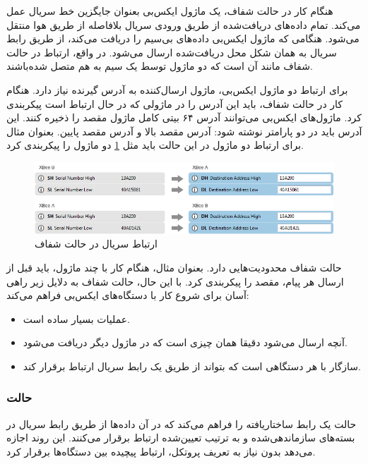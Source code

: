 هنگام کار در حالت شفاف، یک ماژول ایکس‌بی بعنوان جایگزین خط سریال عمل می‌کند. تمام داده‌های دریافت‌شده از طریق ورودی سریال بلافاصله از طریق هوا منتقل می‌شود. هنگامی که ماژول ایکس‌بی داده‌های بی‌سیم را دریافت می‌کند، از طریق رابط سریال به همان شکل محل دریافت‌شده ارسال می‌شود. در واقع، ارتباط در حالت شفاف مانند آن است که دو ماژول توسط یک سیم به هم متصل شده‌باشند\cite{Digi}.


برای ارتباط دو ماژول ایکس‌بی، ماژول ارسال‌کننده به آدرس گیرنده نیاز دارد. هنگام کار در حالت شفاف، باید این آدرس را در ماژولی که در حال ارتباط است پیکربندی کرد. ماژول‌های ایکس‌بی می‌توانند آدرس ۶۴ بیتی کامل ماژول مقصد را ذخیره کنند\cite{Digi}. این آدرس باید در دو پارامتر نوشته شود: آدرس مقصد بالا و آدرس مقصد پایین. بعنوان مثال برای ارتباط دو ماژول در این حالت باید مثل \cref{fig:transparent_config} \cite{Digi} دو ماژول را پیکربندی کرد.


\begin{figure}[!h]
\centering\includegraphics[scale=.7]{transparent_config.png}
\caption{ارتباط سریال در حالت شفاف \cite{Digi}}\label{fig:transparent_config}
\end{figure}

حالت شفاف محدودیت‌هایی دارد. بعنوان مثال، هنگام کار با چند ماژول، باید قبل از ارسال هر پیام، مقصد را پیکربندی کرد. با این حال، حالت شفاف به دلایل زیر راهی آسان برای شروع کار با دستگاه‌های ایکس‌بی فراهم می‌کند:

\begin{itemize}
\item عملیات بسیار ساده است.
\item آنچه ارسال می‌شود دقیقا همان چیزی است که در ماژول دیگر دریافت می‌شود.
\item سازگار با هر دستگاهی است که بتواند از طریق یک رابط سریال ارتباط برقرار کند.
\end{itemize}

\subsubsection{حالت }

حالت  یک رابط ساختاریافته را فراهم می‌کند که در آن داده‌ها از طریق رابط سریال در بسته‌های سازماندهی‌شده و به ترتیب تعیین‌شده ارتباط برقرار می‌کنند. این روند اجازه می‌دهد بدون نیاز به تعریف پروتکل، ارتباط پیچیده بین دستگاه‌ها برقرار کرد\cite{Digi}.

